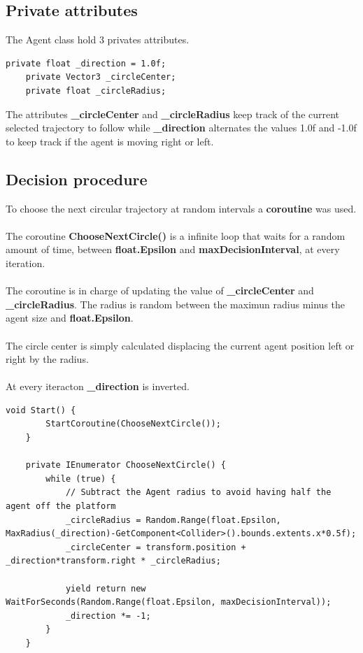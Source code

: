 \documentclass[12pt, a4paper]{article}
\begin{document}
\subsection{Private attributes}
The Agent class hold 3 privates attributes.
\begin{lstlisting}[caption={Private attributes}]
    private float _direction = 1.0f;
    private Vector3 _circleCenter;
    private float _circleRadius;
\end{lstlisting}
The attributes \textbf{\_circleCenter} and \textbf{\_circleRadius} keep track of the current selected trajectory to follow while \textbf{\_direction} alternates the values 1.0f and -1.0f to keep track if the agent is moving right or left.

\subsection{Decision procedure}
To choose the next circular trajectory at random intervals a \textbf{coroutine} was used.\\\\
The coroutine \textbf{ChooseNextCircle()} is a infinite loop that waits for a random amount of time, between \textbf{float.Epsilon} and \textbf{maxDecisionInterval}, at every iteration.\\\\
The coroutine is in charge of updating the value of \textbf{\_circleCenter} and \textbf{\_circleRadius}. The radius is random between the maximun radius minus the agent size and \textbf{float.Epsilon}.\\\\
The circle center is simply calculated displacing the current agent position left or right by the radius.\\\\
At every iteracton \textbf{\_direction} is inverted.

\begin{lstlisting}[caption={Decision procedure}]
    void Start() {
        StartCoroutine(ChooseNextCircle());
    }

    private IEnumerator ChooseNextCircle() {
        while (true) {
            // Subtract the Agent radius to avoid having half the agent off the platform
            _circleRadius = Random.Range(float.Epsilon, MaxRadius(_direction)-GetComponent<Collider>().bounds.extents.x*0.5f);
            _circleCenter = transform.position + _direction*transform.right * _circleRadius;

            yield return new WaitForSeconds(Random.Range(float.Epsilon, maxDecisionInterval));
            _direction *= -1;
        }
    }
\end{lstlisting}
\end{document}
